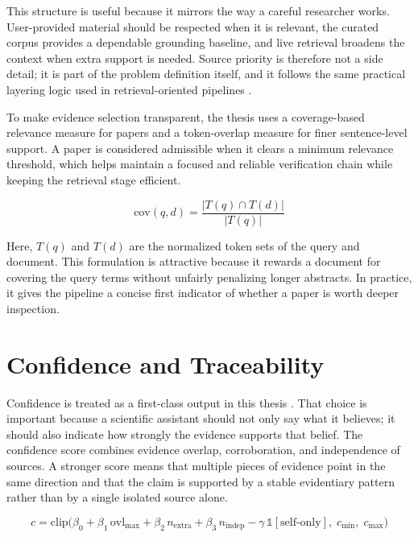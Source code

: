 This structure is useful because it mirrors the way a careful researcher works. User-provided material should be respected when it is relevant, the curated corpus provides a dependable grounding baseline, and live retrieval broadens the context when extra support is needed. Source priority is therefore not a side detail; it is part of the problem definition itself, and it follows the same practical layering logic used in retrieval-oriented pipelines \cite{ragsurvey2024,es2023ragas}.

To make evidence selection transparent, the thesis uses a coverage-based relevance measure for papers and a token-overlap measure for finer sentence-level support. A paper is considered admissible when it clears a minimum relevance threshold, which helps maintain a focused and reliable verification chain while keeping the retrieval stage efficient.

\begin{equation}
\mathrm{cov}(q, d) = \frac{|T(q) \cap T(d)|}{|T(q)|}
\end{equation}

Here, \(T(q)\) and \(T(d)\) are the normalized token sets of the query and document. This formulation is attractive because it rewards a document for covering the query terms without unfairly penalizing longer abstracts. In practice, it gives the pipeline a concise first indicator of whether a paper is worth deeper inspection.

\section{Confidence and Traceability}

Confidence is treated as a first-class output in this thesis \cite{kadavath2022language,lin2021truthfulqa}. That choice is important because a scientific assistant should not only say what it believes; it should also indicate how strongly the evidence supports that belief. The confidence score combines evidence overlap, corroboration, and independence of sources. A stronger score means that multiple pieces of evidence point in the same direction and that the claim is supported by a stable evidentiary pattern rather than by a single isolated source alone.

\begin{equation}
c = \mathrm{clip}\Big(\beta_0 + \beta_1\,\mathrm{ovl}_{\max} + \beta_2\,n_{\mathrm{extra}}
+ \beta_3\,n_{\mathrm{indep}} - \gamma\,\mathbb{1}[\text{self-only}],\; c_{\min},\; c_{\max}\Big)
\end{equation}

